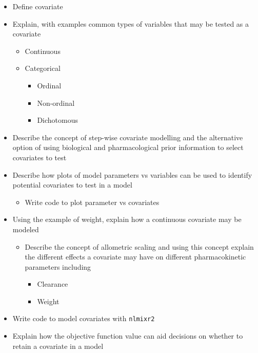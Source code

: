\documentclass[
]{article}
\providecommand{\tightlist}{%
  \setlength{\itemsep}{0pt}\setlength{\parskip}{0pt}}
\begin{document}
\begin{itemize}
\tightlist
\item
  Define covariate
\item
  Explain, with examples common types of variables that may be tested as a covariate

  \begin{itemize}
  \tightlist
  \item
    Continuous
  \item
    Categorical

    \begin{itemize}
    \tightlist
    \item
      Ordinal
    \item
      Non-ordinal
    \item
      Dichotomous
    \end{itemize}
  \end{itemize}
\item
  Describe the concept of step-wise covariate modelling and the alternative option of using biological and pharmacological prior information to select covariates to test
\item
  Describe how plots of model parameters vs variables can be used to identify potential covariates to test in a model

  \begin{itemize}
  \tightlist
  \item
    Write code to plot parameter vs covariates\\
  \end{itemize}
\item
  Using the example of weight, explain how a continuous covariate may be modeled

  \begin{itemize}
  \tightlist
  \item
    Describe the concept of allometric scaling and using this concept explain the different effects a covariate may have on different pharmacokinetic parameters including

    \begin{itemize}
    \tightlist
    \item
      Clearance
    \item
      Weight
    \end{itemize}
  \end{itemize}
\item
  Write code to model covariates with \texttt{nlmixr2}
\item
  Explain how the objective function value can aid decisions on whether to retain a covariate in a model
\end{itemize}
\end{document}
